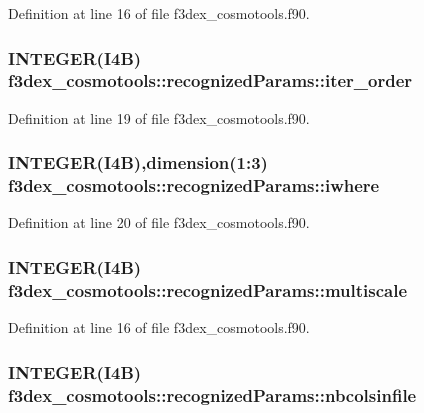 Definition at line 16 of file f3dex\_\-cosmotools.f90.

\hypertarget{typef3dex__cosmotools_1_1recognized_params_aa852a64a0af873408ec5f28b8c542c93}{
\subsubsection[{iter\_\-order}]{\setlength{\rightskip}{0pt plus 5cm}INTEGER(I4B) {\bf f3dex\_\-cosmotools::recognizedParams::iter\_\-order}}}
\label{typef3dex__cosmotools_1_1recognized_params_aa852a64a0af873408ec5f28b8c542c93}


Definition at line 19 of file f3dex\_\-cosmotools.f90.

\hypertarget{typef3dex__cosmotools_1_1recognized_params_a3d160c10b254a3978520c26f72be8bf2}{
\subsubsection[{iwhere}]{\setlength{\rightskip}{0pt plus 5cm}INTEGER(I4B),dimension(1:3) {\bf f3dex\_\-cosmotools::recognizedParams::iwhere}}}
\label{typef3dex__cosmotools_1_1recognized_params_a3d160c10b254a3978520c26f72be8bf2}


Definition at line 20 of file f3dex\_\-cosmotools.f90.

\hypertarget{typef3dex__cosmotools_1_1recognized_params_af05862653d2611ab453a39910888c6ec}{
\subsubsection[{multiscale}]{\setlength{\rightskip}{0pt plus 5cm}INTEGER(I4B) {\bf f3dex\_\-cosmotools::recognizedParams::multiscale}}}
\label{typef3dex__cosmotools_1_1recognized_params_af05862653d2611ab453a39910888c6ec}


Definition at line 16 of file f3dex\_\-cosmotools.f90.

\hypertarget{typef3dex__cosmotools_1_1recognized_params_a6f2ceeddaa65071f8b0f2c1df017fdb9}{
\subsubsection[{nbcolsinfile}]{\setlength{\rightskip}{0pt plus 5cm}INTEGER(I4B) {\bf f3dex\_\-cosmotools::recognizedParams::nbcolsinfile}}}
\label{typef3dex__cosmotools_1_1recognized_params_a6f2ceeddaa65071f8b0f2c1df017fdb9}



